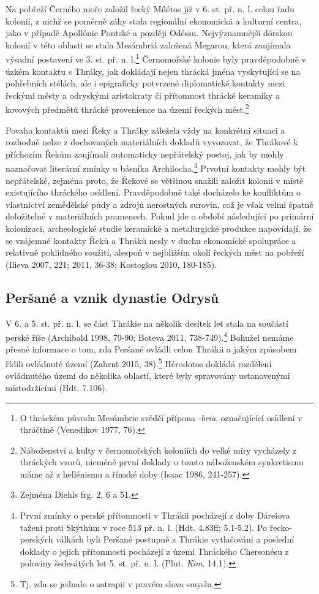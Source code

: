 Na pobřeží Černého moře založil řecký Mílétos již v 6. st. př. n. l. celou řadu kolonií, z nichž se poměrně záhy stala regionální ekonomická a kulturní centra, jako v případě Apollónie Pontské a později Odéssu. Nejvýznamnější dórskou kolonií v této oblasti se stala Mesámbriá založená Megarou, která zaujímala výsadní postavení ve 3. st. př. n. l.\footnote{O thráckém původu Mesámbrie svědčí přípona -{\em bria}, označujícící osídlení v thráčtině (Venedikov 1977, 76).} Černomořské kolonie byly pravděpodobně v úzkém kontaktu s Thráky, jak dokládají nejen thrácká jména vyskytující se na pohřebních stélách, ale i epigraficky potvrzené diplomatické kontakty mezi řeckými městy a odryskými aristokraty či přítomnost thrácké keramiky a kovových předmětů thrácké provenience na území řeckých měst.\footnote{Náboženství a kulty v černomořských koloniích do velké míry vycházely z thráckých vzorů, nicméně první doklady o tomto náboženském synkretismu máme až z hellénismu a římské doby (Isaac 1986, 241-257).}

Povaha kontaktů mezi Řeky a Thráky záležela vždy na konkrétní situaci a rozhodně nelze z dochovaných materiálních dokladů vyvozovat, že Thrákové k příchozím Řekům zaujímali automaticky nepřátelský postoj, jak by mohly naznačovat literární zmínky u básníka Archilocha.\footnote{Zejména Diehls frg. 2, 6 a 51.} Prvotní kontakty mohly být nepřátelské, zejména proto, že Řekové se většinou snažili založit kolonii v místě existujícího thráckého osídlení. Pravděpodobně také docházelo ke konfliktům o vlastnictví zemědělské půdy a zdrojů nerostných surovin, což je však velmi špatně doložitelné v materiálních pramenech. Pokud jde o období následující po primární kolonizaci, archeologické studie keramické a metalurgické produkce napovídají, že se vzájemné kontakty Řeků a Thráků nesly v duchu ekonomické spolupráce a relativně poklidného soužití, alespoň v nejbližším okolí řeckých měst na pobřeží (Ilieva 2007, 221; 2011, 36-38; Kostoglou 2010, 180-185).

\subsection[peršané-a-vznik-dynastie-odrysů]{Peršané a vznik dynastie Odrysů}

V 6. a 5. st. př. n. l. se část Thrákie na několik desítek let stala na součástí perské říše (Archibald 1998, 79-90; Boteva 2011, 738-749).\footnote{První zmínky o perské přítomnosti v Thrákii pocházejí z doby Dáreiova tažení proti Skýthům v roce 513 př. n. l. (Hdt. 4.83ff; 5.1-5.2). Po řecko-perských válkách byli Peršané postupně z Thrákie vytlačováni a poslední doklady o jejich přítomnosti pocházejí z území Thráckého Chersonésu z poloviny šedesátých let 5. st. př. n. l. (Plut. {\em Kim}. 14.1).} Bohužel nemáme přesné informace o tom, zda Peršané ovládli celou Thrákii a jakým způsobem řídili ovládnuté území (Zahrnt 2015, 38).\footnote{Tj. zda se jednalo o satrapii v pravém slova smyslu.} Hérodotos dokládá rozdělení ovládnutého území do několika oblastí, které byly spravovány ustanovenými místodržícími (Hdt. 7.106).

